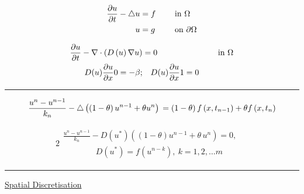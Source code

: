 \documentclass[a4paper]{article}
\begin{document}
\begin{landscape}
    \large
    \centering
    \begin{minipage}{0.480\columnwidth}
        \begin{alignat}{2}
            \diffp{u}{t} - \triangle u & = f  &\quad& \text{ in } \Omega \\
            u & = g  &\quad& \text{ on } \partial\Omega 
        \end{alignat}
    \end{minipage}
    \hfill
    \begin{minipage}{0.480\columnwidth}
        \begin{alignat}{2}
            \diffp{u}{t} - \nabla \cdot \left(D\left(u\right) \nabla u\right) & = 0  &\quad& \text{ in } \Omega  \\
            D(u) \diffp{u}{x}{0} = -\beta; & \quad   D(u) \diffp{u}{x}{1} = 0 
        \end{alignat}
    \end{minipage}

    \bigskip
    \noindent\rule{\columnwidth}{1pt}

    \begin{minipage}{0.4800\columnwidth}
        \begin{equation}
            \frac{u^n - u^{n-1}}{k_n} - \triangle \left(\left(1-\theta\right)u^{n-1} + \theta u^n\right) \\ = \left(1-\theta\right)f\left(x,t_{n-1}\right) + \theta f\left(x,t_n\right)
        \end{equation}
    \end{minipage}
    \hfill
    \begin{minipage}{0.4800\columnwidth}
        \begin{alignat}{2}
            \begin{multlined}
                \frac{u^n - u^{n-1}}{k_n} - D\left(u^\ast\right) \left(\left(1-\theta\right)u^{n-1} + \theta\, u^n\right) = 0, \quad  \\
                \qquad\qquad D\left(u^\ast\right) = f(u^{n-k}), \ k = 1,2,\dots m
            \end{multlined} 
        \end{alignat}
    \end{minipage}

    \bigskip
    \noindent\rule{\columnwidth}{1pt}

    \begin{flushleft}
        \underline{Spatial Discretisation}


\end{flushleft}
\end{landscape}
\end{document}
